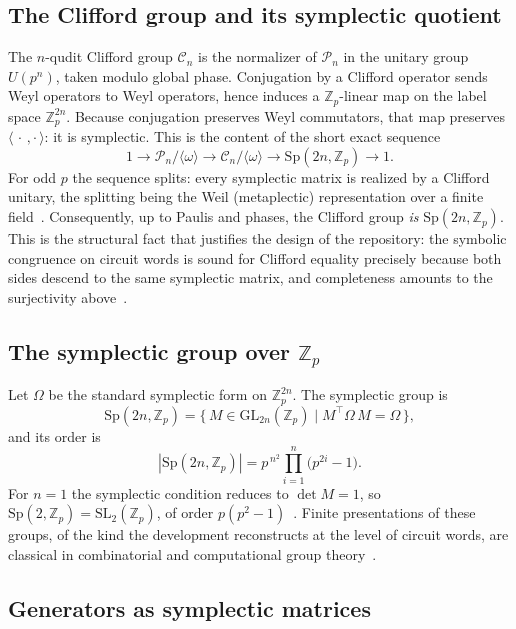 \documentclass[sigplan,screen,review,anonymous]{acmart}
\newcommand{\Zp}{\mathbb{Z}_p}
\newcommand{\Sp}{\mathrm{Sp}}
\newcommand{\SL}{\mathrm{SL}}
\newcommand{\GL}{\mathrm{GL}}
\newcommand{\Cliff}{\mathcal{C}}
\newcommand{\PauliGrp}{\mathcal{P}}
\begin{document}
\subsection{The Clifford group and its symplectic quotient}

The \(n\)-qudit Clifford group \(\Cliff_n\) is the normalizer of
\(\PauliGrp_n\) in the unitary group \(U(p^n)\), taken modulo global
phase.  Conjugation by a Clifford operator sends Weyl operators to Weyl
operators, hence induces a \(\Zp\)-linear map on the label space
\(\Zp^{2n}\).  Because conjugation preserves Weyl commutators, that map
preserves \(\langle\,\cdot\,,\cdot\,\rangle\): it is symplectic.  This
is the content of the short exact sequence
\[
  1 \longrightarrow \PauliGrp_n/\langle\omega\rangle
    \longrightarrow \Cliff_n/\langle\omega\rangle
    \longrightarrow \Sp(2n,\Zp)
    \longrightarrow 1 .
\]
For odd \(p\) the sequence splits: every symplectic matrix is realized
by a Clifford unitary, the splitting being the Weil (metaplectic)
representation over a finite
field~\cite{Neuhauser2002,Appleby2005,Gross2006}.  Consequently, up to
Paulis and phases, the Clifford group \emph{is} \(\Sp(2n,\Zp)\).  This
is the structural fact that justifies the design of the repository: the
symbolic congruence on circuit words is sound for Clifford equality
precisely because both sides descend to the same symplectic matrix, and
completeness amounts to the surjectivity
above~\cite{Hostens2005,deBeaudrap2013,Farinholt2014}.

\subsection{The symplectic group over \(\Zp\)}

Let \(\Omega\) be the standard symplectic form on \(\Zp^{2n}\).  The
symplectic group is
\[
  \Sp(2n,\Zp)
    = \{\, M \in \GL_{2n}(\Zp) \mid M^\top \Omega\, M = \Omega \,\},
\]
and its order is
\[
  |\Sp(2n,\Zp)| = p^{\,n^2}\prod_{i=1}^{n}\bigl(p^{2i}-1\bigr).
\]
For \(n=1\) the symplectic condition reduces to \(\det M = 1\), so
\(\Sp(2,\Zp)=\SL_2(\Zp)\), of order \(p(p^2-1)\)~\cite{LidlNiederreiter}.
Finite presentations of these groups, of the kind the development
reconstructs at the level of circuit words, are classical in
combinatorial and computational group
theory~\cite{MagnusKarrassSolitar,Johnson1997,Sims1994}.

\subsection{Generators as symplectic matrices}
\end{document}
